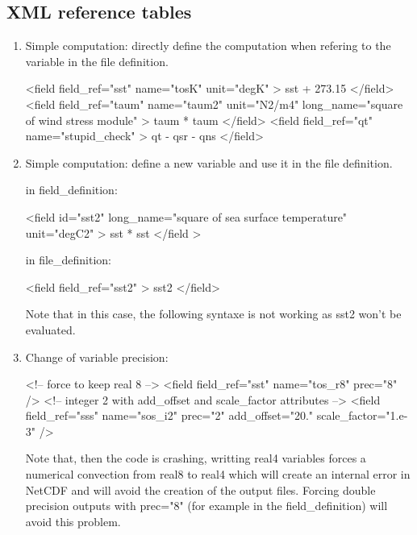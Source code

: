 \documentclass[../tex_main/NEMO_manual]{subfiles}
\begin{document}
\subsection{XML reference tables}
\label{subsec:IOM_xmlref}

\begin{enumerate}
\item
  Simple computation: directly define the computation when refering to the variable in the file definition.

\begin{xmllines}
<field field_ref="sst"  name="tosK"  unit="degK" > sst + 273.15 </field>
<field field_ref="taum" name="taum2" unit="N2/m4" long_name="square of wind stress module" >	taum * taum </field>
<field field_ref="qt"   name="stupid_check" > qt - qsr - qns </field>
\end{xmllines}

\item
  Simple computation: define a new variable and use it in the file definition.

in field\_definition:

\begin{xmllines}
<field id="sst2" long_name="square of sea surface temperature" unit="degC2" >  sst * sst </field >
\end{xmllines}

in file\_definition:

\begin{xmllines}
<field field_ref="sst2" > sst2 </field>
\end{xmllines}

Note that in this case, the following syntaxe  is not working as
sst2 won't be evaluated.

\item
  Change of variable precision:

\begin{xmllines}
<!-- force to keep real 8 -->
<field field_ref="sst" name="tos_r8" prec="8" />
<!-- integer 2  with add_offset and scale_factor attributes -->
<field field_ref="sss" name="sos_i2" prec="2" add_offset="20." scale_factor="1.e-3" />
\end{xmllines}

Note that, then the code is crashing, writting real4 variables forces a numerical convection from 
real8 to real4 which will create an internal error in NetCDF and will avoid the creation of the output files.
Forcing double precision outputs with prec="8" (for example in the field\_definition) will avoid this problem.


\end{enumerate}
\end{document}
